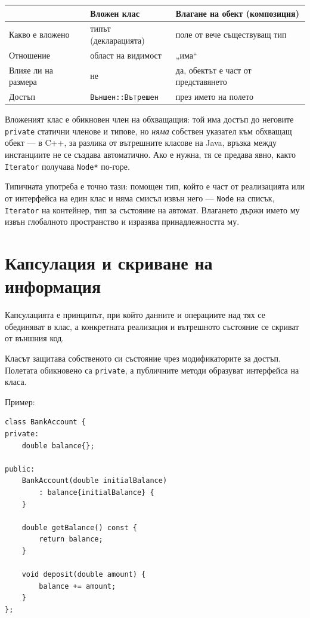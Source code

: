 \begin{center}
\small
\begin{tabular}{lll}
\toprule
& Вложен клас & Влагане на обект (композиция)\\
\midrule
Какво е вложено & типът (декларацията) & поле от вече съществуващ тип\\
Отношение & област на видимост & „има“\\
Влияе ли на размера & не & да, обектът е част от представянето\\
Достъп & \verb|Външен::Вътрешен| & през името на полето\\
\bottomrule
\end{tabular}
\end{center}

Вложеният клас е обикновен член на обхващащия: той има достъп до неговите
\verb|private| статични членове и типове, но \emph{няма} собствен указател към
обхващащ обект --- в C++, за разлика от вътрешните класове на Java, връзка
между инстанциите не се създава автоматично. Ако е нужна, тя се предава явно,
както \verb|Iterator| получава \verb|Node*| по-горе.

Типичната употреба е точно тази: помощен тип, който е част от реализацията или
от интерфейса на един клас и няма смисъл извън него --- \verb|Node| на списък,
\verb|Iterator| на контейнер, тип за състояние на автомат. Влагането държи името
му извън глобалното пространство и изразява принадлежността му.

\section{Капсулация и скриване на информация}\label{s:16.4}

\begin{defn}
Капсулацията е принципът, при който данните и операциите над тях се обединяват в клас, а конкретната реализация и вътрешното състояние се скриват от външния код.
\end{defn}

Класът защитава собственото си състояние чрез модификаторите за достъп. Полетата обикновено са \texttt{private}, а публичните методи образуват интерфейса на класа.

Пример:

\begin{verbatim}
class BankAccount {
private:
    double balance{};

public:
    BankAccount(double initialBalance)
        : balance{initialBalance} {
    }

    double getBalance() const {
        return balance;
    }

    void deposit(double amount) {
        balance += amount;
    }
};
\end{verbatim}

